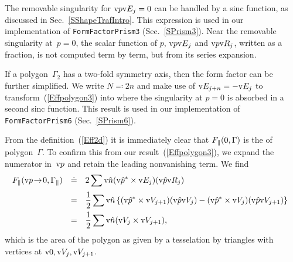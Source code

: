 The removable singularity for $\text{v}{p}\text{v}{E}_j=0$
can be handled by a sinc function, as discussed in Sec.~\ref{SShapeTrafIntro}.
This expression is used in our implementation of \texttt{FormFactorPrism3}
(Sec.~\ref{SPrism3}).
Near the removable singularity at~$p=0$,
the scalar function of $p$, $\text{v}{p}\text{v}{E}_j$ and $\text{v}{p}\text{v}{R}_j$,
written as a fraction,
 is not computed term by term,
but from its series expansion.

If a polygon~$\Gamma_2$ has a two-fold symmetry axis,
then the form factor can be further simplified.
We write $N\eqqcolon2n$
and make use of $\text{v}{E}_{j+n}=-\text{v}{E}_j$ to transform~(\ref{Effpolygon3}) into
where the singularity at $p=0$ is absorbed in a second sinc function.
This result is used in our implementation of \texttt{FormFactorPrism6}
(Sec.~\ref{SPrism6}).
%

From the definition~(\ref{Eff2d}) it is immediately clear
that $F_\parallel(0,\Gamma)$ is the  of polygon~$\Gamma$.
To confirm this from our result~(\ref{Effpolygon3}),
we expand the numerator in~$\text{v}{p}$ and retain the leading nonvanishing term.
We find
\begin{equation}\label{Effarea}
  \begin{array}{@{}lcl}
  \FFP(\qp\!\to\!0,\Gp)
    &\doteq& \displaystyle 2\sum \n(\uqp^*\times\E_j) (\uqp\R_j)\\[1.8ex]
    &=&\displaystyle \frac{1}{2}\sum \n\left\{
        (\uqp^*\times\V_{j+1})(\uqp\V_j)
      - (\uqp^*\times\V_j)(\uqp\V_{j+1})
      \right\}\\[1.8ex]
    &=&\displaystyle \frac{1}{2}\sum \n(\V_j\times\V_{j+1}),
  \end{array}
\end{equation}
which is the area of the polygon
as given by a tesselation by triangles with vertices at $\text{v}{0},\text{v}{V}_j,\text{v}{V}_{j+1}$.


%
%


